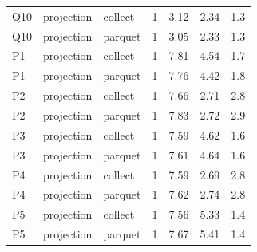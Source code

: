 \begin{tabular}{lllrrrr}
Q10 & projection & collect & 1 & 3.12 & 2.34 & 1.3 \\
Q10 & projection & parquet & 1 & 3.05 & 2.33 & 1.3 \\
P1 & projection & collect & 1 & 7.81 & 4.54 & 1.7 \\
P1 & projection & parquet & 1 & 7.76 & 4.42 & 1.8 \\
P2 & projection & collect & 1 & 7.66 & 2.71 & 2.8 \\
P2 & projection & parquet & 1 & 7.83 & 2.72 & 2.9 \\
P3 & projection & collect & 1 & 7.59 & 4.62 & 1.6 \\
P3 & projection & parquet & 1 & 7.61 & 4.64 & 1.6 \\
P4 & projection & collect & 1 & 7.59 & 2.69 & 2.8 \\
P4 & projection & parquet & 1 & 7.62 & 2.74 & 2.8 \\
P5 & projection & collect & 1 & 7.56 & 5.33 & 1.4 \\
P5 & projection & parquet & 1 & 7.67 & 5.41 & 1.4 \\
\bottomrule
\end{tabular}
